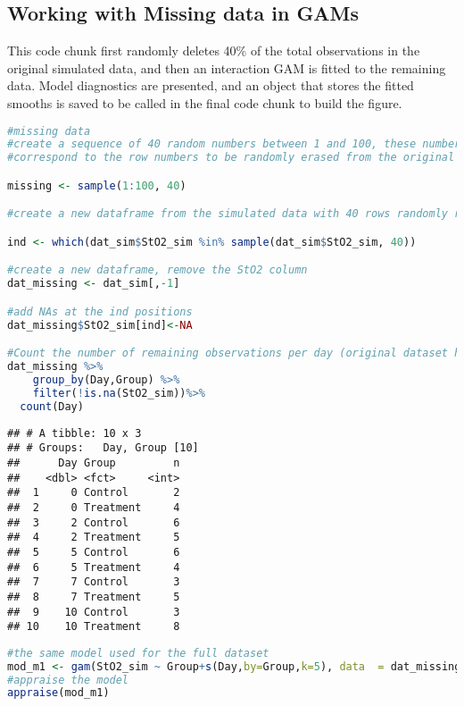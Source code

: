 \documentclass[
]{article}
\begin{document}
\hypertarget{working-with-missing-data-in-gams}{%
\subsection{Working with Missing data in GAMs}\label{working-with-missing-data-in-gams}}

This code chunk first randomly deletes 40\% of the total observations in the original simulated data, and then an interaction GAM is fitted to the remaining data. Model diagnostics are presented, and an object that stores the fitted smooths is saved to be called in the final code chunk to build the figure.

\begin{lstlisting}[language=R]
#missing data
#create a sequence of 40 random numbers between 1 and 100, these numbers will
#correspond to the row numbers to be randomly erased from the original dataset

missing <- sample(1:100, 40)

#create a new dataframe from the simulated data with 40 rows randomly removed, keep the missing values as NA

ind <- which(dat_sim$StO2_sim %in% sample(dat_sim$StO2_sim, 40))

#create a new dataframe, remove the StO2 column
dat_missing <- dat_sim[,-1]

#add NAs at the ind positions
dat_missing$StO2_sim[ind]<-NA 

#Count the number of remaining observations per day (original dataset had 10 per group per day)
dat_missing %>%
    group_by(Day,Group) %>%
    filter(!is.na(StO2_sim))%>%
  count(Day)
\end{lstlisting}

\begin{lstlisting}
## # A tibble: 10 x 3
## # Groups:   Day, Group [10]
##      Day Group         n
##    <dbl> <fct>     <int>
##  1     0 Control       2
##  2     0 Treatment     4
##  3     2 Control       6
##  4     2 Treatment     5
##  5     5 Control       6
##  6     5 Treatment     4
##  7     7 Control       3
##  8     7 Treatment     5
##  9    10 Control       3
## 10    10 Treatment     8
\end{lstlisting}

\begin{lstlisting}[language=R]
#the same model used for the full dataset
mod_m1 <- gam(StO2_sim ~ Group+s(Day,by=Group,k=5), data  = dat_missing,family=scat)
#appraise the model
appraise(mod_m1)
\end{lstlisting}
\end{document}
